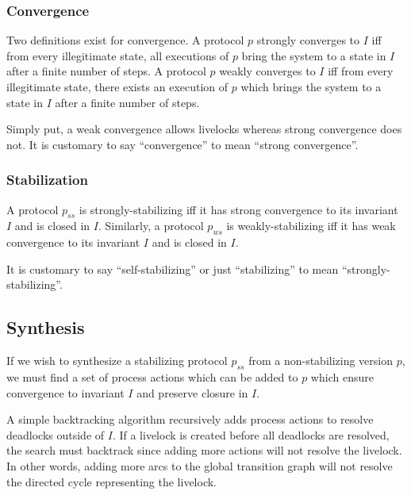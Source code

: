 \subsubsection{Convergence}

Two definitions exist for convergence.
A protocol $p$ strongly converges to $I$ iff from every illegitimate state, all executions of $p$ bring the system to a state in $I$ after a finite number of steps.
A protocol $p$ weakly converges to $I$ iff from every illegitimate state, there exists an execution of $p$ which brings the system to a state in $I$ after a finite number of steps.

Simply put, a weak convergence allows livelocks whereas strong convergence does not.
It is customary to say ``convergence'' to mean ``strong convergence''.

\subsubsection{Stabilization}

A protocol $p_{ss}$ is strongly-stabilizing iff it has strong convergence to its invariant $I$ and is closed in $I$.
Similarly, a protocol $p_{ws}$ is weakly-stabilizing iff it has weak convergence to its invariant $I$ and is closed in $I$.

It is customary to say ``self-stabilizing'' or just ``stabilizing'' to mean ``strongly-stabilizing''.

\subsection{Synthesis}

If we wish to synthesize a stabilizing protocol $p_{ss}$ from a non-stabilizing version $p$, we must find a set of process actions which can be added to $p$ which ensure convergence to invariant $I$ and preserve closure in $I$.

A simple backtracking algorithm recursively adds process actions to resolve deadlocks outside of $I$.
If a livelock is created before all deadlocks are resolved, the search must backtrack since adding more actions will not resolve the livelock.
In other words, adding more arcs to the global transition graph will not resolve the directed cycle representing the livelock.







